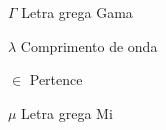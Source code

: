 
\begin{simbolos}
    \item[$ \Gamma $] Letra grega Gama
    \item[$ \lambda $] Comprimento de onda
    \item[$ \in $] Pertence
    \item[$ \mu $] Letra grega Mi
\end{simbolos}

